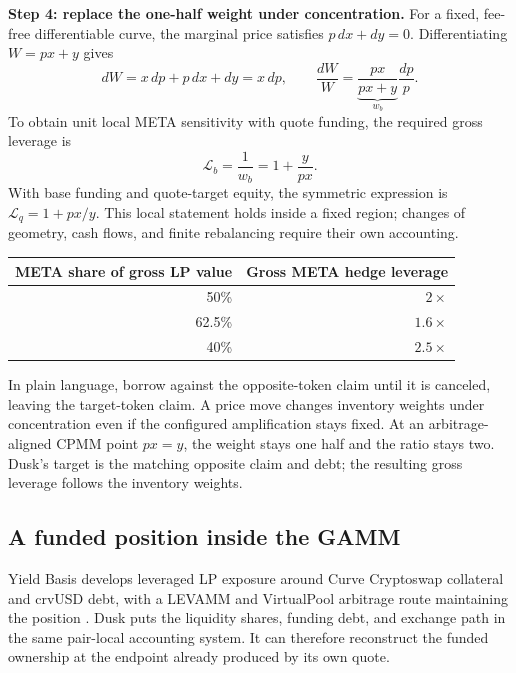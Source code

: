 \textbf{Step 4: replace the one-half weight under concentration.} For a fixed, fee-free differentiable curve, the marginal price satisfies $p\,dx+dy=0$. Differentiating $W=px+y$ gives
\[
dW=x\,dp+p\,dx+dy=x\,dp,\qquad
\frac{dW}{W}=\underbrace{\frac{px}{px+y}}_{w_b}\frac{dp}{p}.
\]
To obtain unit local META sensitivity with quote funding, the required gross leverage is
\begin{equation}
\boxed{\mathcal L_b=\frac1{w_b}=1+\frac{y}{px}.}
\label{eq:weight-leverage}
\end{equation}
With base funding and quote-target equity, the symmetric expression is $\mathcal L_q=1+px/y$. This local statement holds inside a fixed region; changes of geometry, cash flows, and finite rebalancing require their own accounting.

\begin{center}\small
\begin{tabular}{@{}rr@{}}\toprule
META share of gross LP value & Gross META hedge leverage \\\midrule
50\% & $2\times$ \\
62.5\% & $1.6\times$ \\
40\% & $2.5\times$ \\\bottomrule
\end{tabular}\end{center}
In plain language, borrow against the opposite-token claim until it is canceled, leaving the target-token claim. A price move changes inventory weights under concentration even if the configured amplification stays fixed. At an arbitrage-aligned CPMM point $px=y$, the weight stays one half and the ratio stays two. Dusk's target is the matching opposite claim and debt; the resulting gross leverage follows the inventory weights.


\subsection{A funded position inside the GAMM}

Yield Basis develops leveraged LP exposure around Curve Cryptoswap collateral and crvUSD debt, with a LEVAMM and VirtualPool arbitrage route maintaining the position \cite{yieldbasis-technical}. Dusk puts the liquidity shares, funding debt, and exchange path in the same pair-local accounting system. It can therefore reconstruct the funded ownership at the endpoint already produced by its own quote.

